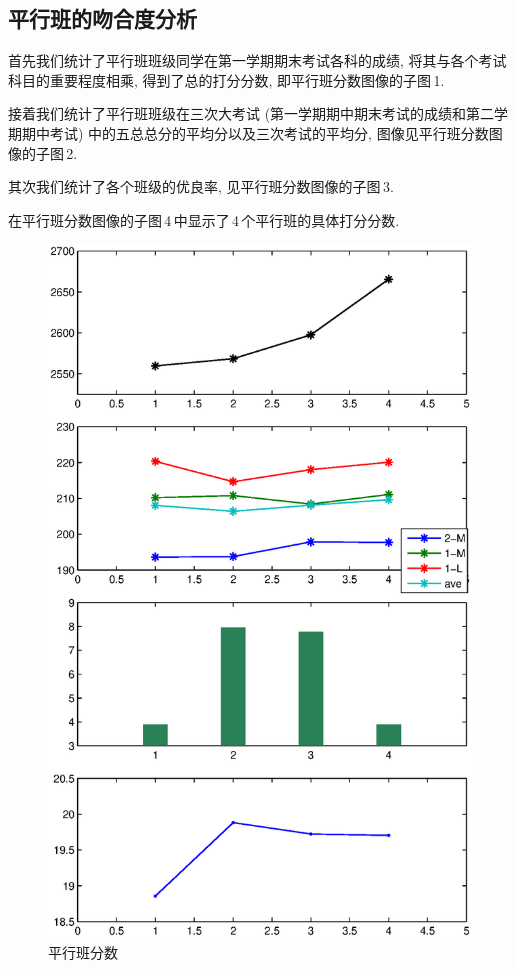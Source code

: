 \documentclass[a4paper]{article}
\begin{document}
 \subsection{平行班的吻合度分析}
  首先我们统计了平行班班级同学在第一学期期末考试各科的成绩, 将其与各个考试科目的重要程度相乘, 得到了总的打分分数, 即平行班分数图像的子图\,1.\par
  接着我们统计了平行班班级在三次大考试 (第一学期期中期末考试的成绩和第二学期期中考试) 中的五总总分的平均分以及三次考试的平均分, 图像见平行班分数图像的子图\,2.\par
  其次我们统计了各个班级的优良率, 见平行班分数图像的子图\,3.\par
  在平行班分数图像的子图\,4\,中显示了\,4\,个平行班的具体打分分数.\par
  \begin{figure}[H]
  \centerline{\includegraphics[scale=0.5]{result.eps}}
  \caption{平行班分数}
  \end{figure}
\end{document}

